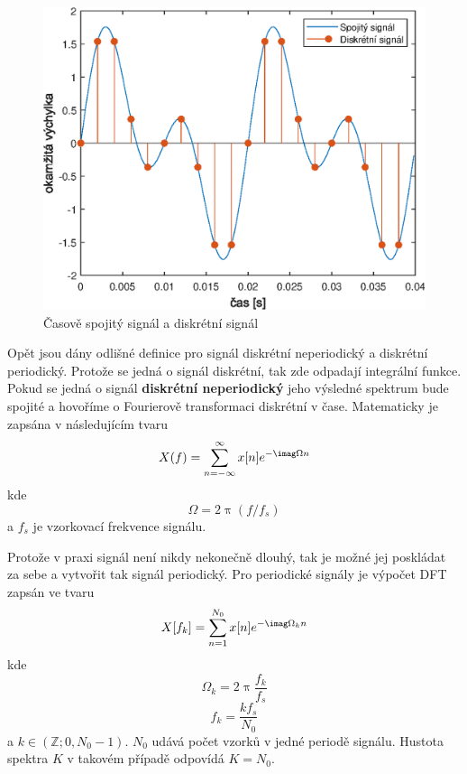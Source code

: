   \begin{figure}[H]
    \centering
    \includegraphics[width = 0.8\linewidth]{obrazky/Discrete_signal.eps}
    \caption{Časově spojitý signál a diskrétní signál}
    \label{fig:Discrete_signal}
  \end{figure}

  Opět jsou dány odlišné definice pro signál diskrétní neperiodický a diskrétní periodický. Protože se jedná o signál diskrétní, tak zde odpadají integrální funkce.
  Pokud se jedná o signál \textbf{diskrétní neperiodický} jeho výsledné spektrum bude spojité a hovoříme o Fourierově transformaci diskrétní v čase. Matematicky je zapsána v následujícím tvaru
  \begin{equation}
    X(f) = \sum_{n = -\infty}^{\infty} x[n] e^{-\imag \Omega n}
    \label{rov:DTFT}
  \end{equation}
  kde
  \begin{equation}
    \Omega = 2 \uppi (f/f_s)
  \end{equation}
  a $f_s$ je vzorkovací frekvence signálu.

  Protože v praxi signál není nikdy nekonečně dlouhý, tak je možné jej poskládat za sebe a vytvořit tak signál periodický. Pro periodické signály je výpočet \acs{DFT} zapsán ve tvaru
  \begin{equation}
    X[f_k] = \sum_{n = 1}^{N_0} x[n] e^{-\imag\Omega_k n}
    \label{rov:DFT}
  \end{equation}
  kde
  \begin{equation}
    \Omega_k = 2 \uppi \frac{f_k}{f_s}
  \end{equation}
  \begin{equation}
    f_k = \frac{k f_s}{N_0}
  \end{equation}
  a $k \in(\mathbb{Z}; 0, N_0 -1)$. $N_0$ udává počet vzorků v jedné periodě signálu.
  Hustota spektra $K$ v takovém případě odpovídá $K = N_0$.

